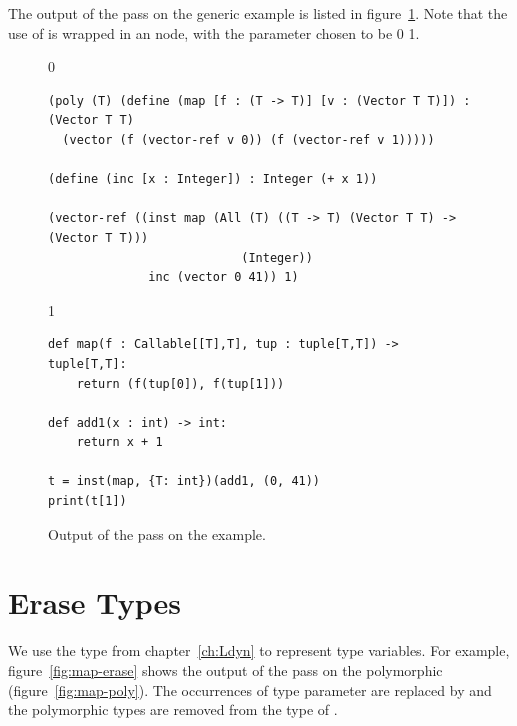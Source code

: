 \documentclass[7x10]{TimesAPriori_MIT}%
\def\racketEd{0}
\def\pythonEd{1}
\def\edition{0}
\newcommand{\racket}[1]{{\if\edition\racketEd{#1}\fi}}
\newcommand{\python}[1]{{\if\edition\pythonEd #1\fi}}
\numberwithin{theorem}{chapter}
\numberwithin{definition}{chapter}
\numberwithin{equation}{chapter}
\begin{document}
The output of the  pass on the generic 
example is listed in figure~\ref{fig:map-resolve}. Note that the use
of  is wrapped in an  node, with the parameter
 chosen to be \racket{} \python{}.

\begin{figure}[tbp]
\begin{tcolorbox}[colback=white]  
\if\edition\racketEd    
\begin{lstlisting}
(poly (T) (define (map [f : (T -> T)] [v : (Vector T T)]) : (Vector T T)
  (vector (f (vector-ref v 0)) (f (vector-ref v 1)))))

(define (inc [x : Integer]) : Integer (+ x 1))

(vector-ref ((inst map (All (T) ((T -> T) (Vector T T) -> (Vector T T)))
                           (Integer))
              inc (vector 0 41)) 1)
\end{lstlisting}
\fi
\if\edition\pythonEd
\begin{lstlisting}
def map(f : Callable[[T],T], tup : tuple[T,T]) -> tuple[T,T]:
    return (f(tup[0]), f(tup[1]))

def add1(x : int) -> int:
    return x + 1

t = inst(map, {T: int})(add1, (0, 41))
print(t[1])
\end{lstlisting}
\fi
\end{tcolorbox}
\caption{Output of the  pass on the  example.}
\label{fig:map-resolve}
\end{figure}

\section{Erase Types}
\label{sec:erase_types}

We use the \CANYTY{} type from chapter~\ref{ch:Ldyn} to
represent type variables. For example, figure~\ref{fig:map-erase}
shows the output of the  pass on the polymorphic
 (figure~\ref{fig:map-poly}). The occurrences of
type parameter  are replaced by \CANYTY{} and the polymorphic
 types are removed from the type of . 
\end{document}
